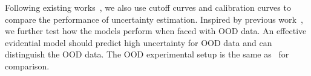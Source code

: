 Following existing works~\citeauthor{NEURIPS2020_aab08546,kuleshov2018accurate}, we also use cutoff curves and calibration curves to compare the performance of uncertainty estimation. Inspired by previous work~\cite{NEURIPS2020_aab08546}, we further test how the models perform when faced with OOD data. An effective evidential model should predict high uncertainty for OOD data and can distinguish the OOD data. The OOD experimental setup is the same as~\citeauthor{NEURIPS2020_aab08546} for comparison.




